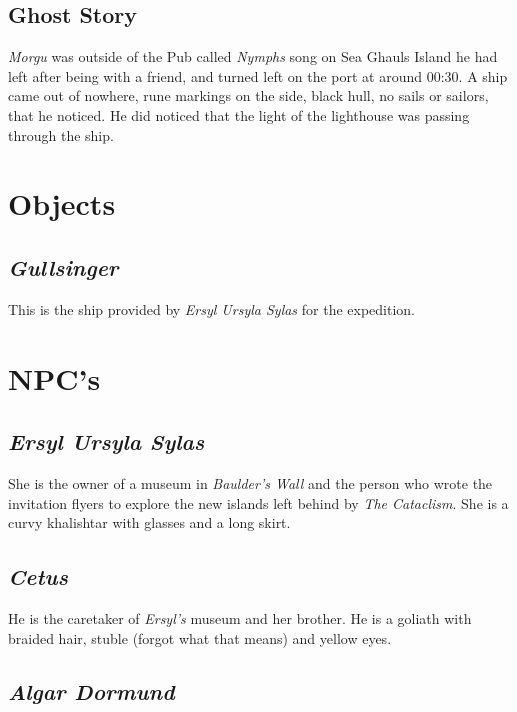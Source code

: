 \documentclass{article}
\begin{document}
\begin{multicols}{2}
    \subsection{Ghost Story}

    \textit{Morgu} was outside of the Pub called \textit{Nymphs} song on Sea Ghauls Island he had left after being with a friend, and turned left on the port at around 00:30. A ship came out of nowhere, rune markings on the side, black
    hull, no sails or sailors, that he noticed. He did noticed that the light of the lighthouse was passing through the ship.

    \section{Objects}

    \subsection{\textit{Gullsinger}}

    This is the ship provided by \textit{Ersyl Ursyla Sylas} for the expedition.

    \section{NPC's}

    \subsection{\textit{Ersyl Ursyla Sylas}}

    She is the owner of a museum in \textit{Baulder's Wall} and the person who wrote the invitation flyers to explore the new islands left behind by \textit{The Cataclism}. She is a curvy khalishtar with glasses and a
    long skirt.

    \subsection{\textit{Cetus}}

    He is the caretaker of \textit{Ersyl's} museum and her brother. He is a goliath with braided hair, stuble (forgot what that means) and yellow eyes.

    \subsection{\textit{Algar Dormund}}


\end{multicols}
\end{document}
